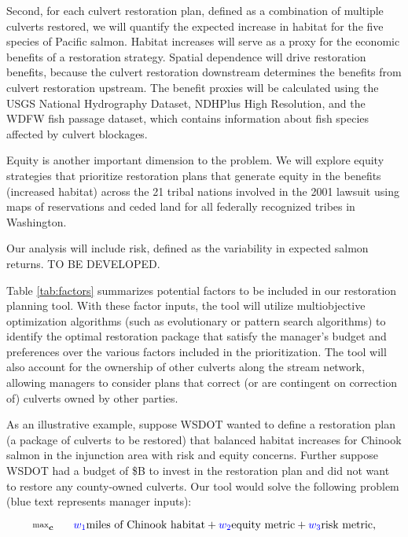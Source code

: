 \documentclass[12pt]{elsarticle}
\begin{document}
Second, for each culvert restoration plan, defined as a combination of multiple culverts restored, we will quantify the expected increase in habitat for the five species of Pacific salmon. Habitat increases will serve as a proxy for the economic benefits of a restoration strategy. Spatial dependence will drive restoration benefits, because the culvert restoration downstream determines the benefits from culvert restoration upstream. The benefit proxies will be calculated using the USGS National Hydrography Dataset, NDHPlus High Resolution, and the WDFW fish passage dataset, which contains information about fish species affected by culvert blockages.

Equity is another important dimension to the problem. We will explore equity strategies that prioritize restoration plans that generate equity in the benefits (increased habitat) across the 21 tribal nations involved in the 2001 lawsuit using maps of reservations and ceded land for all federally recognized tribes in Washington. 

Our analysis will include risk, defined as the variability in expected salmon returns. TO BE DEVELOPED.

Table \ref{tab:factors} summarizes potential factors to be included in our restoration planning tool. With these factor inputs, the tool will utilize multiobjective optimization algorithms (such as evolutionary or pattern search algorithms) to identify the optimal restoration package that satisfy the manager's budget and preferences over the various factors included in the prioritization. The tool will also account for the ownership of other culverts along the stream network, allowing managers to consider plans that correct (or are contingent on correction of) culverts owned by other parties.

As an illustrative example, suppose WSDOT wanted to define a restoration plan (a package of culverts to be restored) that balanced habitat increases for Chinook salmon in the injunction area with risk and equity concerns. Further suppose WSDOT had a budget of \$B to invest in the restoration plan and did not want to restore any county-owned culverts. Our tool would solve the following problem (blue text represents manager inputs):

\begin{equation*}
\substack{\text{max}}_{\boldsymbol{c}}\hspace{0.25in} \textcolor{blue}{w_1} \text{miles of Chinook habitat} + \textcolor{blue}{w_2} \text{equity metric} + \textcolor{blue}{w_3} \text{risk metric},
\end{equation*}
\end{document}
